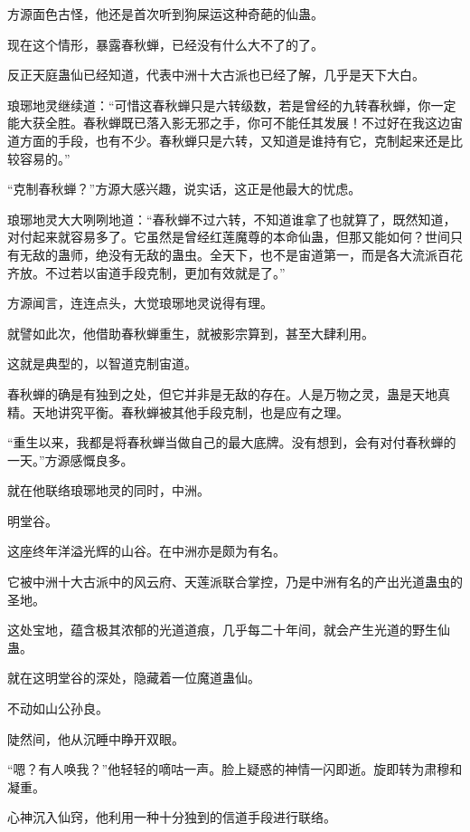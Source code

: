 
\begin{this_body}



方源面色古怪，他还是首次听到狗屎运这种奇葩的仙蛊。

现在这个情形，暴露春秋蝉，已经没有什么大不了的了。

反正天庭蛊仙已经知道，代表中洲十大古派也已经了解，几乎是天下大白。

琅琊地灵继续道：“可惜这春秋蝉只是六转级数，若是曾经的九转春秋蝉，你一定能大获全胜。春秋蝉既已落入影无邪之手，你可不能任其发展！不过好在我这边宙道方面的手段，也有不少。春秋蝉只是六转，又知道是谁持有它，克制起来还是比较容易的。”

“克制春秋蝉？”方源大感兴趣，说实话，这正是他最大的忧虑。

琅琊地灵大大咧咧地道：“春秋蝉不过六转，不知道谁拿了也就算了，既然知道，对付起来就容易多了。它虽然是曾经红莲魔尊的本命仙蛊，但那又能如何？世间只有无敌的蛊师，绝没有无敌的蛊虫。全天下，也不是宙道第一，而是各大流派百花齐放。不过若以宙道手段克制，更加有效就是了。”

方源闻言，连连点头，大觉琅琊地灵说得有理。

就譬如此次，他借助春秋蝉重生，就被影宗算到，甚至大肆利用。

这就是典型的，以智道克制宙道。

春秋蝉的确是有独到之处，但它并非是无敌的存在。人是万物之灵，蛊是天地真精。天地讲究平衡。春秋蝉被其他手段克制，也是应有之理。

“重生以来，我都是将春秋蝉当做自己的最大底牌。没有想到，会有对付春秋蝉的一天。”方源感慨良多。

就在他联络琅琊地灵的同时，中洲。

明堂谷。

这座终年洋溢光辉的山谷。在中洲亦是颇为有名。

它被中洲十大古派中的风云府、天莲派联合掌控，乃是中洲有名的产出光道蛊虫的圣地。

这处宝地，蕴含极其浓郁的光道道痕，几乎每二十年间，就会产生光道的野生仙蛊。

就在这明堂谷的深处，隐藏着一位魔道蛊仙。

不动如山公孙良。

陡然间，他从沉睡中睁开双眼。

“嗯？有人唤我？”他轻轻的嘀咕一声。脸上疑惑的神情一闪即逝。旋即转为肃穆和凝重。

心神沉入仙窍，他利用一种十分独到的信道手段进行联络。


\end{this_body}
